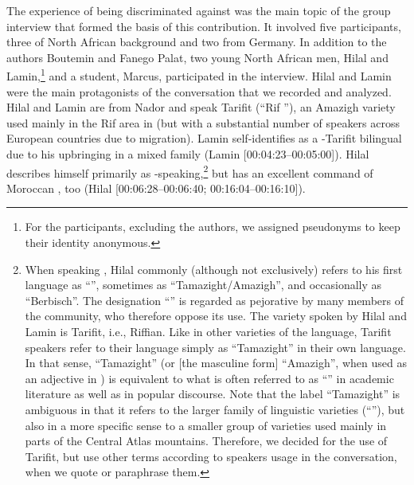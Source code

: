 \documentclass[output=paper,colorlinks,citecolor=brown]{langscibook}
\begin{document}
The experience of being discriminated against was the main topic of the group interview that formed the basis of this contribution. It involved five participants, three of North African background and two from Germany. In addition to the authors Boutemin and Fanego Palat, two young North African men, Hilal and Lamin,\footnote{%
For the participants, excluding the authors, we assigned pseudonyms to keep their identity anonymous.} and a  student, Marcus, participated in the interview. Hilal and Lamin were the main protagonists of the conversation that we recorded and analyzed. Hilal and Lamin are from Nador and speak Tarifit (``Rif ''), an Amazigh variety used mainly in the Rif area in  (but with a substantial number of speakers across European countries due to migration). Lamin self-identifies as a -Tarifit bilingual due to his upbringing in a mixed family (Lamin [00:04:23--00:05:00]). Hilal describes himself primarily as -speak\-ing,\footnote{%
When speaking , Hilal commonly (although not exclusively) refers to his first language as ``'', sometimes as ``Tamazight/Amazigh'', and occasionally as ``Berbisch''. The designation ``'' is regarded as pejorative by many members of the community, who therefore oppose its use. The variety spoken by Hilal and Lamin is Tarifit, i.e., Riffian. Like in other varieties of the language, Tarifit speakers refer to their language simply as ``Tamazight'' in their own language. In that sense, ``Tamazight'' (or [the masculine form] ``Amazigh'', when used as an adjective in ) is equivalent to what is often referred to as ``'' in academic literature as well as in popular discourse. Note that the label ``Tamazight'' is ambiguous in that it refers to the larger family of linguistic varieties (``''), but also in a more specific sense to a smaller group of varieties used mainly in parts of the Central Atlas mountains. Therefore, we decided for the use of Tarifit, but use other terms according to speakers usage in the conversation, when we quote or paraphrase them.} but has an excellent command of Moroccan , too (Hilal [00:06:28--00:06:40; 00:16:04--00:16:10]). 
\end{document}
